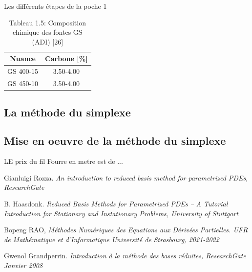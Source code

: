 \documentclass[12pt]{article}
\begin{document}
Les différents étapes  de la poche 1








\begin{table}[H]
    \caption{Tableau 1.5: Composition chimique des fontes GS (ADI) [26]}
    \centering
        \begin{tabular}{|c|c|}
        \hline
        Nuance & Carbone [\%] \\ \hline
        GS 400-15 & 3.50-4.00  \\ \hline
        GS 450-10 & 3.50-4.00  \\ \hline
        \end{tabular}
\end{table}
    
    

\subsection{La méthode du simplexe}

\subsection{Mise en oeuvre de la méthode du simplexe}

LE prix du fil Fourre en metre est de ...


\begin{thebibliography}{9}

Gianluigi Rozza.  \emph{An introduction to reduced basis method for parametrized PDEs, ResearchGate}

B. Haasdonk.  \emph{Reduced Basis Methods for Parametrized PDEs –
A Tutorial Introduction for Stationary and
Instationary Problems, University of Stuttgart  } 



Bopeng RAO,  \emph{ Méthodes Numériques
des Equations aux Dérivées Partielles. UFR de Mathématique et d’Informatique
Université de Strasbourg, 2021-2022 }

Gwenol Grandperrin.  \emph{Introduction à la méthode des bases réduites, ResearchGate Janvier 2008 }

\end{thebibliography}
\end{document}

